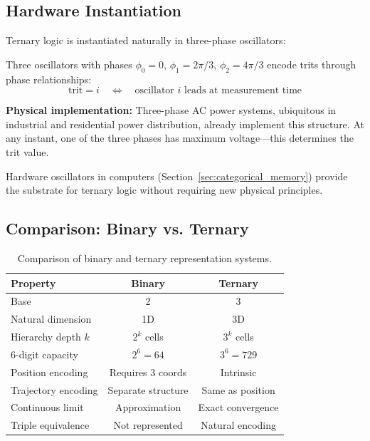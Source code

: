 \subsection{Hardware Instantiation}

Ternary logic is instantiated naturally in three-phase oscillators:

\begin{proposition}
\label{prop:three_phase}
Three oscillators with phases $\phi_0 = 0$, $\phi_1 = 2\pi/3$, $\phi_2 = 4\pi/3$ encode trits through phase relationships:
\begin{equation}
\text{trit} = i \quad \Leftrightarrow \quad \text{oscillator } i \text{ leads at measurement time}
\end{equation}
\end{proposition}

\textbf{Physical implementation:} Three-phase AC power systems, ubiquitous in industrial and residential power distribution, already implement this structure. At any instant, one of the three phases has maximum voltage—this determines the trit value.

Hardware oscillators in computers (Section~\ref{sec:categorical_memory}) provide the substrate for ternary logic without requiring new physical principles.

\subsection{Comparison: Binary vs. Ternary}

\begin{table}[h]
\centering
\begin{tabular}{lcc}
\hline
\textbf{Property} & \textbf{Binary} & \textbf{Ternary} \\
\hline
Base & 2 & 3 \\
Natural dimension & 1D & 3D \\
Hierarchy depth $k$ & $2^k$ cells & $3^k$ cells \\
6-digit capacity & $2^6 = 64$ & $3^6 = 729$ \\
Position encoding & Requires 3 coords & Intrinsic \\
Trajectory encoding & Separate structure & Same as position \\
Continuous limit & Approximation & Exact convergence \\
Triple equivalence & Not represented & Natural encoding \\
\hline
\end{tabular}
\caption{Comparison of binary and ternary representation systems.}
\label{tab:binary_ternary}
\end{table}


